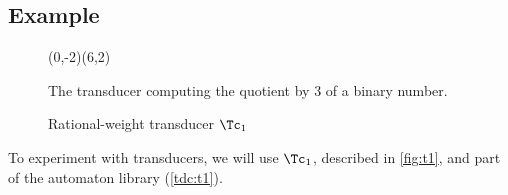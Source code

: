 \subsection{Example}

\begin{figure}[tp]
  \begin{center}
    \begin{VCPicture}{(0,-2)(6,2)}
        
    \end{VCPicture}
    \begin{legend}
      The transducer computing the quotient by 3 of a binary number.
    \end{legend}
    \caption{Rational-weight transducer $\Tc_1$}
    \label{fig:t1}
  \end{center}
\end{figure}


To experiment with transducers, we will use $\Tc_1$,
described in \autoref{fig:t1}, and part of the automaton library
(\autoref{tdc:t1}).


